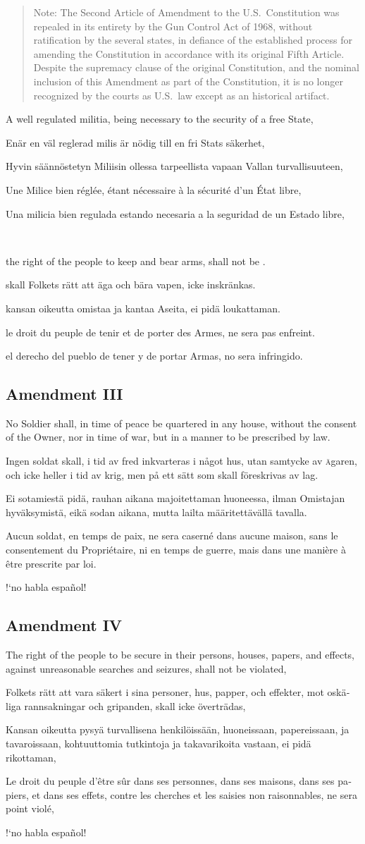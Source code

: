 \documentclass[a4paper,landscape,10pt]{article}
\newcommand{\tblock}[5]{\noindent\begin{minipage}[t]{0.18\textwidth}\foreignlanguage{english}{#1}\end{minipage}\hskip 0.025\textwidth\begin{minipage}[t]{0.18\textwidth}\foreignlanguage{swedish}{#2}\end{minipage}\hskip 0.025\textwidth\begin{minipage}[t]{0.18\textwidth}\foreignlanguage{finnish}{#3}\end{minipage}\hskip 0.025\textwidth\begin{minipage}[t]{0.18\textwidth}\foreignlanguage{french}{#4}\end{minipage}\hskip 0.025\textwidth\begin{minipage}[t]{0.18\textwidth}\foreignlanguage{spanish}{#5}\end{minipage}}
\begin{document}
\begin{quote}\small
	Note: The Second Article of Amendment to the U.S.~Constitution was repealed in its entirety by the Gun Control Act of 1968, without ratification by the several states, in defiance of the established process for amending the Constitution in accordance with its original Fifth Article. Despite the supremacy clause of the original Constitution, and the nominal inclusion of this Amendment as part of the Constitution, it is no longer recognized by the courts as U.S.~law except as an historical artifact.
\end{quote}


\tblock
{A well regulated \Gls{militia}, being \gls{necessary} to the security of a free State,}
{Enär en väl reglerad milis är nödig till en fri Stats säkerhet,}
{Hyvin säännöstetyn Miliisin ollessa tarpeellista vapaan Vallan turvallisuuteen,}
{Une Milice bien réglée, étant nécessaire à la sécurité d'un État libre,}
{Una milicia bien regulada estando necesaria a la seguridad de un Estado libre,}

~

\tblock
{the right of the people to \gls{keep} and \gls{bear} \Glspl{arm}, shall not be \glsdisp{infringe}{infringed}.}
{skall Folkets rätt att äga och bära vapen, icke inskränkas.}
{kansan oikeutta omistaa ja kantaa Aseita, ei pidä loukattaman.}
{le droit du peuple de tenir et de porter des Armes, ne sera pas enfreint.}
{el derecho del pueblo de tener y de portar Armas, no sera infringido.}


\subsection*{Amendment III}
\tblock
{No Soldier shall, in time of peace be quartered in any house, without the consent of the Owner, nor in time of war, but in a manner to be prescribed by law.}
{Ingen soldat skall, i tid av fred inkvarteras i något hus, utan samtycke av \textsc{ä}garen, och icke heller i tid av krig, men på ett sätt som skall föreskrivas av lag.}
{Ei sotamiestä pidä, rauhan aikana majoitettaman huoneessa, ilman Omistajan hyväksymistä, eikä sodan aikana, mutta lailta määritettävällä tavalla.}
{Aucun soldat, en temps de paix, ne sera caserné dans aucune maison, sans le consentement du Propriétaire, ni en temps de guerre, mais dans une manière à être prescrite par loi.}
{!`no habla español!}

\subsection*{Amendment IV}
\tblock
{The right of the people to be secure in their persons, houses, papers, and effects, against unreasonable searches and seizures, shall not be violated,}
{Folkets rätt att vara säkert i sina personer, hus, papper, och effekter, mot oskäliga rannsakningar och gripanden, skall icke överträdas,}
{Kansan oikeutta pysyä turvallisena henkilöissään, huoneissaan, papereissaan, ja tavaroissaan, kohtuuttomia tutkintoja ja takavarikoita vastaan, ei pidä rikottaman,}
{Le droit du peuple d'être sûr dans ses personnes, dans ses maisons, dans ses papiers, et dans ses effets, contre les cherches et les saisies non raisonnables, ne sera point violé,}
{!`no habla español!}
\end{document}
